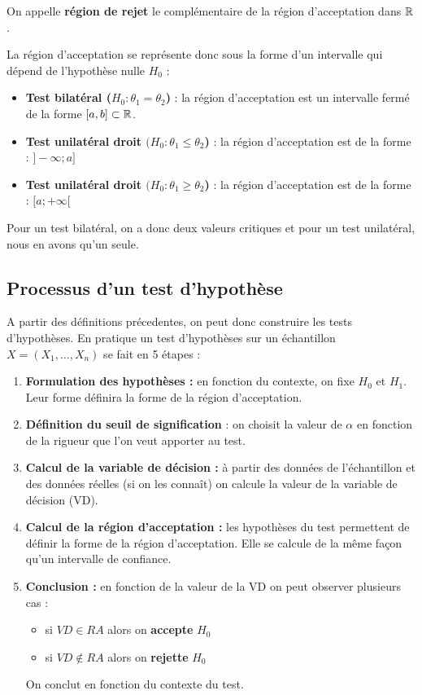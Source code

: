 On appelle \textbf{région de rejet} le complémentaire de la région d'acceptation dans $\mathbb{R}$. 

La région d'acceptation se représente donc sous la forme d'un intervalle qui dépend de l'hypothèse nulle $H_0$ :
\begin{itemize}
    \item \textbf{Test bilatéral ($H_0 : \theta_1 = \theta_2$)} : la région d'acceptation est un 
    intervalle fermé de la forme $ [a,b] \subset \mathbb{R}$. 
    \item \textbf{Test unilatéral droit $(H_0 : \theta_1 \leqslant \theta_2$)} : la région d'acceptation 
     est de la forme : $] - \infty ; a ]$
    \item \textbf{Test unilatéral droit $(H_0 : \theta_1 \geqslant \theta_2$)} : la région d'acceptation 
    est de la forme : $[a; + \infty[$ 
\end{itemize}
Pour un test bilatéral, on a donc deux valeurs critiques et pour un test unilatéral, nous en avons qu'un seule. 

\subsection{Processus d'un test d'hypothèse}

A partir des définitions précedentes, on peut donc construire les tests d'hypothèses. 
En pratique un test d'hypothèses sur un échantillon $ X = (X_1, \dots, X_n)$ se fait en 5 étapes :
\begin{enumerate}
    \item \textbf{Formulation des hypothèses : } en fonction du contexte, on fixe $H_0$ et $H_1$.
    Leur forme définira la forme de la région d'acceptation. 
    \item \textbf{Définition du seuil de signification} : on choisit la valeur de $\alpha$ en fonction 
    de la rigueur que l'on veut apporter au test. 
    \item \textbf{Calcul de la variable de décision :} à partir des données de l'échantillon et des données 
    réelles (si on les connaît) on calcule la valeur de la variable de décision (VD). 
    \item \textbf{Calcul de la région d'acceptation :} les hypothèses du test permettent de définir 
    la forme de la région d'acceptation. Elle se calcule de la même façon qu'un intervalle de confiance. 
    \item \textbf{Conclusion :} en fonction de la valeur de la VD on peut observer plusieurs cas :
        \begin{itemize}
            \item si \textbf{$VD \in RA$} alors on \textbf{accepte} $H_0$
            \item si \textbf{$VD \not \in RA$} alors on \textbf{rejette} $H_0$
        \end{itemize}
        On conclut en fonction du contexte du test. 
\end{enumerate}

